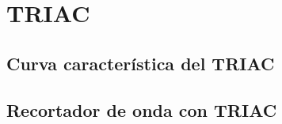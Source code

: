 \chapter{TRIAC}

  \section{Curva característica del TRIAC}

  \section{Recortador de onda con TRIAC}
